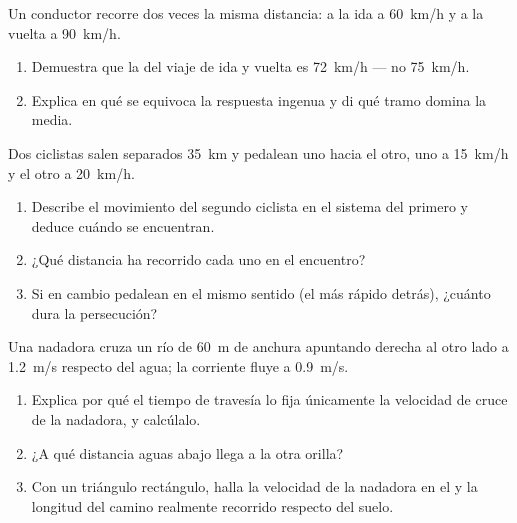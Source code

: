 \begin{exercise}[$\star\star\star$]\label{exo:g10:relative-motion:12}
Un conductor recorre dos veces la misma distancia: a la ida a
\qty{60}{km/h} y a la vuelta a \qty{90}{km/h}.
\begin{enumerate}
  \item Demuestra que la  del viaje de ida y vuelta es
        \qty{72}{km/h} --- no \qty{75}{km/h}.
  \item Explica en qué se equivoca la respuesta ingenua y di qué tramo
        domina la media.
\end{enumerate}
\end{exercise}

\begin{exercise}[$\star\star\star$]\label{exo:g10:relative-motion:13}
Dos ciclistas salen separados \qty{35}{km} y pedalean uno hacia el otro,
uno a \qty{15}{km/h} y el otro a \qty{20}{km/h}.
\begin{enumerate}
  \item Describe el movimiento del segundo ciclista en el sistema del
        primero y deduce cuándo se encuentran.
  \item ¿Qué distancia ha recorrido cada uno en el encuentro?
  \item Si en cambio pedalean en el mismo sentido (el más rápido
        detrás), ¿cuánto dura la persecución?
\end{enumerate}
\end{exercise}

\begin{exercise}[$\star\star\star$]\label{exo:g10:relative-motion:14}
Una nadadora cruza un río de \qty{60}{m} de anchura apuntando derecha al
otro lado a \qty{1.2}{m/s} respecto del agua; la corriente fluye a
\qty{0.9}{m/s}.
\begin{enumerate}
  \item Explica por qué el tiempo de travesía lo fija únicamente la
        velocidad de cruce de la nadadora, y calcúlalo.
  \item ¿A qué distancia aguas abajo llega a la otra orilla?
  \item Con un triángulo rectángulo, halla la velocidad de la nadadora
        en el  y la longitud del camino realmente
        recorrido respecto del suelo.
\end{enumerate}
\end{exercise}


